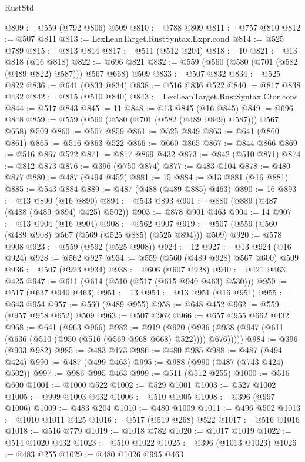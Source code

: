 \begin{lexlean}{RustStd}
\begin{coremodule}
@809 := @559 (@792 @806) @509
@810 := @788 @809
@811 := @757 @810
@812 := @507 @811
@813 := LexLeanTarget.RustSyntax.Expr.cond
@814 := @525 @789
@815 := @813 @814
@817 := @511 (@512 @204)
@818 := 10
@821 := @13 @818 (@16 @818)
@822 := @696 @821
@832 := @559 (@560 (@580 (@701 (@582 (@489 @822) @587))) @567 @668) @509
@833 := @507 @832
@834 := @525 @822
@836 := @641 (@833 @834)
@838 := @516 @836 @522
@840 := @817 @838 @432
@842 := @815 (@510 @840)
@843 := LexLeanTarget.RustSyntax.Ctor.cons
@844 := @517 @843
@845 := 11
@848 := @13 @845 (@16 @845)
@849 := @696 @848
@859 := @559 (@560 (@580 (@701 (@582 (@489 @849) @587))) @567 @668) @509
@860 := @507 @859
@861 := @525 @849
@863 := @641 (@860 @861)
@865 := @516 @863 @522
@866 := @660 @865
@867 := @844 @866
@869 := @516 @867 @522
@871 := @817 @869 @432
@873 := @842 (@510 @871)
@874 := @812 @873
@876 := @396 (@750 @874)
@877 := @483 @104
@878 := @480 @877
@880 := @487 (@494 @452)
@881 := 15
@884 := @13 @881 (@16 @881)
@885 := @543 @884
@889 := @487 (@488 (@489 @885) @463)
@890 := 16
@893 := @13 @890 (@16 @890)
@894 := @543 @893
@901 := @880 (@889 (@487 (@488 (@489 @894) @425) @502))
@903 := @878 @901 @463
@904 := 14
@907 := @13 @904 (@16 @904)
@908 := @562 @907
@919 := @507 (@559 (@560 (@489 @908) @567 (@569 (@525 @885) (@525 @894))) @509)
@920 := @578 @908
@923 := @559 (@592 (@525 @908))
@924 := 12
@927 := @13 @924 (@16 @924)
@928 := @562 @927
@934 := @559 (@560 (@489 @928) @567 @600) @509
@936 := @507 (@923 @934)
@938 := @606 (@607 @928)
@940 := @421 @463 @425
@947 := @611 (@614 (@510 (@517 (@615 @940 @463) @530)))
@950 := @517 (@637 @940 @463)
@951 := 13
@954 := @13 @951 (@16 @951)
@955 := @643 @954
@957 := @560 (@489 @955)
@958 := @648 @452
@962 := @559 (@957 @958 @652) @509
@963 := @507 @962
@966 := @657 @955 @662 @432
@968 := @641 (@963 @966)
@982 := @919
    (@920 (@936 (@938 (@947 (@611 (@636 (@510 (@950 (@516 (@569 @968 @668) @522)))) @676)))))
@984 := @396 (@903 @982)
@985 := @483 @173
@986 := @480 @985
@988 := @487 (@494 @424)
@990 := @487 (@499 @463)
@995 := @988 (@990 (@487 (@743 @424) @502))
@997 := @986 @995 @463
@999 := @511 (@512 @255)
@1000 := @516 @600
@1001 := @1000 @522
@1002 := @529 @1001
@1003 := @527 @1002
@1005 := @999 @1003 @432
@1006 := @510 @1005
@1008 := @396 (@997 @1006)
@1009 := @483 @204
@1010 := @480 @1009
@1011 := @496 @502
@1013 := @1010 @1011 @425
@1016 := @517 (@519 @268) @522
@1017 := @516 @1016
@1018 := @516 @779
@1019 := @1018 @782
@1020 := @1017 @1019
@1022 := @514 @1020 @432
@1023 := @510 @1022
@1025 := @396 (@1013 @1023)
@1026 := @483 @255
@1029 := @480 @1026 @995 @463

\end{coremodule}
\end{lexlean}

